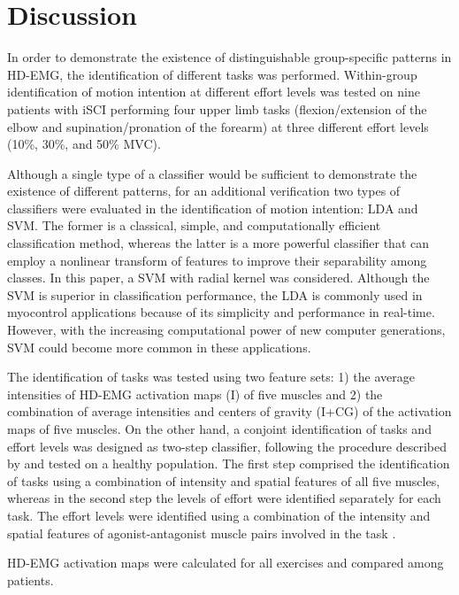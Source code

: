 \section{Discussion}
In order to demonstrate the existence of distinguishable group-specific patterns in HD-EMG, the identification of different tasks was performed. Within-group identification of motion intention at different effort levels was tested on nine patients with iSCI performing four upper limb tasks (flexion/extension of the elbow and supination/pronation of the forearm) at three different effort levels (10\%, 30\%, and 50\% MVC). 

Although a single type of a classifier would be sufficient to demonstrate the existence of different patterns, for an additional verification two types of classifiers were evaluated in the identification of motion intention: LDA and SVM. The former is a classical, simple, and computationally efficient classification method, whereas the latter is a more powerful classifier that can employ a nonlinear transform of features to improve their separability among classes. In this paper, a SVM with radial kernel was considered. Although the SVM is superior in classification performance, the LDA is commonly used in myocontrol applications because of its simplicity and performance in real-time. However, with the increasing computational power of new computer generations, SVM could become more common in these applications. 

The identification of tasks was tested using two feature sets: 1) the average intensities of HD-EMG activation maps (I) of five muscles and 2) the combination of average intensities and centers of gravity (I+CG) of the activation maps of five muscles.
On the other hand, a conjoint identification of tasks and effort levels was designed as two-step classifier, following the procedure described by \citet{Rojas-Martinez2013} and tested on a healthy population. The first step comprised the identification of tasks using a combination of intensity and spatial features of all five muscles, whereas in the second step the levels of effort were identified separately for each task. The effort levels were identified using a combination of the intensity and spatial features of agonist-antagonist muscle pairs involved in the task \citep{Rojas-Martinez2013}.

HD-EMG activation maps were calculated for all exercises and compared among patients. 

